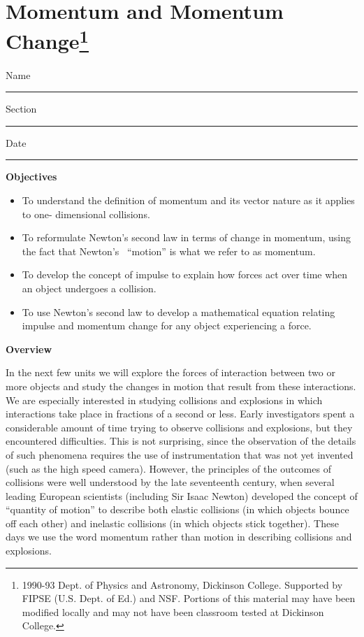 
\section{Momentum and Momentum Change\footnote{
1990-93 Dept. of Physics and Astronomy, Dickinson College. Supported by FIPSE
(U.S. Dept. of Ed.) and NSF. Portions of this material may have been modified
locally and may not have been classroom tested at Dickinson College.
}}

Name \rule{2.0in}{0.1pt}\hfill{}Section \rule{1.0in}{0.1pt}\hfill{}Date \rule{1.0in}{0.1pt}

\textbf{Objectives} 

\begin{itemize}
\item To understand the definition of momentum and its vector nature as it applies
to one- dimensional collisions. 
\item To reformulate Newton's second law in terms of change in momentum, using the
fact that Newton's \ ``motion'' is what we refer to as momentum. 
\item To develop the concept of impulse to explain how forces act over time when an
object undergoes a collision. 
\item To use Newton's second law to develop a mathematical equation relating impulse
and momentum change for any object experiencing a force.
\end{itemize}
\textbf{Overview }

In the next few units we will explore the forces of interaction between two
or more objects and study the changes in motion that result from these interactions.
We are especially interested in studying collisions and explosions in which
interactions take place in fractions of a second or less. Early investigators
spent a considerable amount of time trying to observe collisions and explosions,
but they encountered difficulties. This is not surprising, since the observation
of the details of such phenomena requires the use of instrumentation that was
not yet invented (such as the high speed camera). However, the principles of
the outcomes of collisions were well understood by the late seventeenth century,
when several leading European scientists (including Sir Isaac Newton) developed
the concept of ``quantity of motion'' 
to describe both elastic collisions (in which
objects bounce off each other) and inelastic collisions (in which objects stick
together). These days we use the word momentum rather than motion in describing
collisions and explosions.

